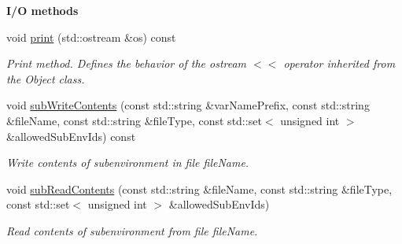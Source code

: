 \begin{Indent}{\bf I/\-O methods}\par
\begin{DoxyCompactItemize}
\item 
void \hyperlink{class_q_u_e_s_o_1_1_gsl_matrix_a4f5f3689f1c013fa9042ea0177d8b020}{print} (std\-::ostream \&os) const 
\begin{DoxyCompactList}\small\item\em Print method. Defines the behavior of the ostream $<$$<$ operator inherited from the Object class. \end{DoxyCompactList}\item 
void \hyperlink{class_q_u_e_s_o_1_1_gsl_matrix_a14c2e7e069603e6906046063d1e6ad13}{sub\-Write\-Contents} (const std\-::string \&var\-Name\-Prefix, const std\-::string \&file\-Name, const std\-::string \&file\-Type, const std\-::set$<$ unsigned int $>$ \&allowed\-Sub\-Env\-Ids) const 
\begin{DoxyCompactList}\small\item\em Write contents of subenvironment in file {\ttfamily file\-Name}. \end{DoxyCompactList}\item 
void \hyperlink{class_q_u_e_s_o_1_1_gsl_matrix_a6a042dc6a13fab4b1929a5222ac700f8}{sub\-Read\-Contents} (const std\-::string \&file\-Name, const std\-::string \&file\-Type, const std\-::set$<$ unsigned int $>$ \&allowed\-Sub\-Env\-Ids)
\begin{DoxyCompactList}\small\item\em Read contents of subenvironment from file {\ttfamily file\-Name}. \end{DoxyCompactList}\end{DoxyCompactItemize}
\end{Indent}
